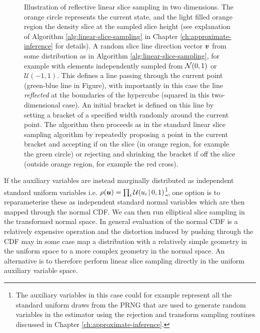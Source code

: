 \begin{figure}[t]
\centering
{}
\caption[Reflective linear slice sampling.]{Illustration of reflective linear slice sampling in two dimensions. The orange circle represents the current state, and the light filled orange region the density slice at the sampled slice height (see explanation of Algorithm \ref{alg:linear-slice-sampling} in Chapter \ref{ch:approximate-inference} for details). A random slice line direction vector $\boldsymbol{v}$ from some distribution as in Algorithm \ref{alg:linear-slice-sampling}, for example with elements independently sampled from $\nrm{0,1}$ or $\mathcal{U}(-1,1)$. This defines a line passing through the current point (green-blue line in Figure), with importantly in this case the line \emph{reflected} at the boundaries of the hypercube (squared in this two-dimensional case). An initial bracket is defined on this line by setting a bracket of a specified width randomly around the current point. The algorithm then proceeds as in the standard linear slice sampling algorithm by repeatedly proposing a point in the current bracket and accepting if on the slice (in orange region, for example the green circle) or rejecting and shrinking the bracket if off the slice (outside orange region, for example the red cross).}
\label{fig:reflective-linear-slice-sampling}
\end{figure}

If the auxiliary variables are instead marginally distributed as independent standard uniform variables i.e. $\rho(\boldsymbol{u}) = \prod_{i}\mathcal{U}(u_i \operatorname{|} 0, 1)$\footnote{The auxiliary variables in this case could for example represent all the standard uniform draws from the \ac{PRNG} that are used to generate random variables in the estimator using the rejection and transform sampling routines discussed in Chapter \ref{ch:approximate-inference}.}, one option is to reparameterise these as independent standard normal variables which are then mapped through the normal \ac{CDF}. We can then run elliptical slice sampling in the transformed normal space. In general evaluation of the normal \ac{CDF} is a relatively expensive operation and the distortion induced by pushing through the \ac{CDF} may in some case map a distribution with a relatively simple geometry in the uniform space to a more complex geometry in the normal space. An alternative is to therefore perform linear slice sampling directly in the uniform auxiliary variable space. 


